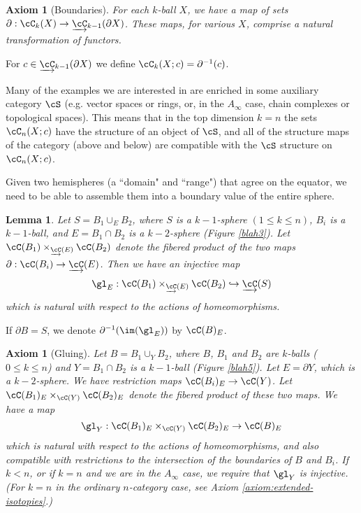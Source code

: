 \documentclass{pnastwo}
\newcommand{\cl}[1]{\underrightarrow{#1}}
\newcommand{\into}{\hookrightarrow}
\newcommand{\bdy}{\partial}
\def\bd{\partial}
\newtheorem{lem}[prop]{Lemma}
\newtheorem{axiom}[prop]{Axiom}
\begin{document}
\begin{article}
\begin{axiom}[Boundaries]\label{nca-boundary}
For each $k$-ball $X$, we have a map of sets $\bd: \cC_k(X)\to \cl{\cC}_{k-1}(\bd X)$.
These maps, for various $X$, comprise a natural transformation of functors.
\end{axiom}

For $c\in \cl{\cC}_{k-1}(\bd X)$ we define $\cC_k(X; c) = \bd^{-1}(c)$.

Many of the examples we are interested in are enriched in some auxiliary category $\cS$
(e.g. vector spaces or rings, or, in the $A_\infty$ case, chain complexes or topological spaces).
This means that in the top dimension $k=n$ the sets $\cC_n(X; c)$ have the structure
of an object of $\cS$, and all of the structure maps of the category (above and below) are
compatible with the $\cS$ structure on $\cC_n(X; c)$.


Given two hemispheres (a ``domain" and ``range") that agree on the equator, we need to be able to 
assemble them into a boundary value of the entire sphere.

\begin{lem}
\label{lem:domain-and-range}
Let $S = B_1 \cup_E B_2$, where $S$ is a $k{-}1$-sphere $(1\le k\le n)$,
$B_i$ is a $k{-}1$-ball, and $E = B_1\cap B_2$ is a $k{-}2$-sphere (Figure \ref{blah3}).
Let $\cC(B_1) \times_{\cl{\cC}(E)} \cC(B_2)$ denote the fibered product of the 
two maps $\bd: \cC(B_i)\to \cl{\cC}(E)$.
Then we have an injective map
\[
	\gl_E : \cC(B_1) \times_{\cl{\cC}(E)} \cC(B_2) \into \cl{\cC}(S)
\]
which is natural with respect to the actions of homeomorphisms.
\end{lem}

If $\bdy B = S$, we denote $\bdy^{-1}(\im(\gl_E))$ by $\cC(B)_E$.

\begin{axiom}[Gluing]
\label{axiom:composition}
Let $B = B_1 \cup_Y B_2$, where $B$, $B_1$ and $B_2$ are $k$-balls ($0\le k\le n$)
and $Y = B_1\cap B_2$ is a $k{-}1$-ball (Figure \ref{blah5}).
Let $E = \bd Y$, which is a $k{-}2$-sphere.
We have restriction maps $\cC(B_i)_E \to \cC(Y)$.
Let $\cC(B_1)_E \times_{\cC(Y)} \cC(B_2)_E$ denote the fibered product of these two maps. 
We have a map
\[
	\gl_Y : \cC(B_1)_E \times_{\cC(Y)} \cC(B_2)_E \to \cC(B)_E
\]
which is natural with respect to the actions of homeomorphisms, and also compatible with restrictions
to the intersection of the boundaries of $B$ and $B_i$.
If $k < n$,
or if $k=n$ and we are in the $A_\infty$ case, 
we require that $\gl_Y$ is injective.
(For $k=n$ in the ordinary $n$-category case, see Axiom \ref{axiom:extended-isotopies}.)
\end{axiom}


\end{article}
\end{document}
